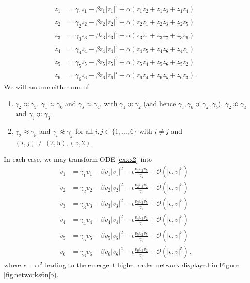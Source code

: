 \documentclass[12pt]{article}
\renewcommand{\mathcal}{\mathscr}
\theoremstyle{plain}
\theoremstyle{definition}
\theoremstyle{remark}
\theoremstyle{remark}
\begin{document}
\begin{align}\label{exxx2}
\dot{z}_1 &= \gamma_1z_1 - \beta z_1|z_1|^2 + \alpha (z_1\overline{z}_2 + z_1\overline{z}_3 +  z_1\overline{z}_4)\\ \nonumber
\dot{z}_2 &= \gamma_2z_2 - \beta z_2|z_2|^2 + \alpha (z_2\overline{z}_1 + z_2\overline{z}_3 +  z_2\overline{z}_5)\\ \nonumber
\dot{z}_3 &= \gamma_3z_3 - \beta z_3|z_3|^2 + \alpha (z_3\overline{z}_1 + z_3\overline{z}_2 +  z_3\overline{z}_6)\\ \nonumber
\dot{z}_4 &= \gamma_4z_4 - \beta z_4|z_4|^2 + \alpha (z_4\overline{z}_5 + z_4\overline{z}_6 +  z_4\overline{z}_1)\\ \nonumber
\dot{z}_5 &= \gamma_5z_5 - \beta z_5|z_5|^2 + \alpha (z_5\overline{z}_4 + z_5\overline{z}_6 +  z_5\overline{z}_2)\\ \nonumber
\dot{z}_6 &= \gamma_6z_6 - \beta z_6|z_6|^2 + \alpha (z_6\overline{z}_4 + z_6\overline{z}_5 +  z_6\overline{z}_3)\, .
\end{align}
We will assume either one of
\begin{enumerate}
\item $\gamma_2 \approx \gamma_5$,  $\gamma_1 \approx \gamma_6$ and $\gamma_3 \approx \gamma_4$, with $\gamma_1 \not\approx \gamma_2$ (and hence $\gamma_1, \gamma_6 \not\approx \gamma_2, \gamma_5$), $\gamma_2 \not\approx \gamma_3$ and $\gamma_1 \not\approx \gamma_3$. 
\item $\gamma_2 \approx \gamma_5$ and $\gamma_i \not\approx \gamma_j$ for all $i,j \in \{1, \dots, 6\}$ with $i \not= j$ and $(i,j) \not= (2,5), (5,2)$.
\end{enumerate}
In each case, we may transform ODE \eqref{exxx2} into
\begin{align}\label{transform2}
\dot{v}_1 &= \gamma_1v_1 - \beta v_1|v_1|^2 - \epsilon\frac{v_1\overline{v}_2v_5}{\overline{\gamma}_2}  + \mathcal{O}(|\epsilon, v|^5)\\ \nonumber
\dot{v}_2 &= \gamma_2v_2 - \beta v_2|v_2|^2 - \epsilon\frac{v_2\overline{v}_5v_2}{\overline{\gamma}_5}  + \mathcal{O}(|\epsilon, v|^5)\\ \nonumber
\dot{v}_3 &= \gamma_3v_3 - \beta v_3|v_3|^2 - \epsilon\frac{v_3\overline{v}_2v_5}{\overline{\gamma}_2}  + \mathcal{O}(|\epsilon, v|^5)\\ \nonumber
\dot{v}_4 &= \gamma_4v_4 - \beta v_4|v_4|^2 - \epsilon\frac{v_4\overline{v}_5v_2}{\overline{\gamma}_5}  + \mathcal{O}(|\epsilon, v|^5)\\ \nonumber
\dot{v}_5 &= \gamma_5v_5 - \beta v_5|v_5|^2 - \epsilon\frac{v_5\overline{v}_2v_5}{\overline{\gamma}_2}  + \mathcal{O}(|\epsilon, v|^5)\\ \nonumber
\dot{v}_6 &= \gamma_6v_6 - \beta v_6|v_6|^2 - \epsilon\frac{v_6\overline{v}_5v_2}{\overline{\gamma}_5}  + \mathcal{O}(|\epsilon, v|^5)\, ,
\end{align}
where $\epsilon = \alpha^2$ leading to the emergent higher order network displayed in Figure \ref{fig:networks6n}b).
\end{document}
